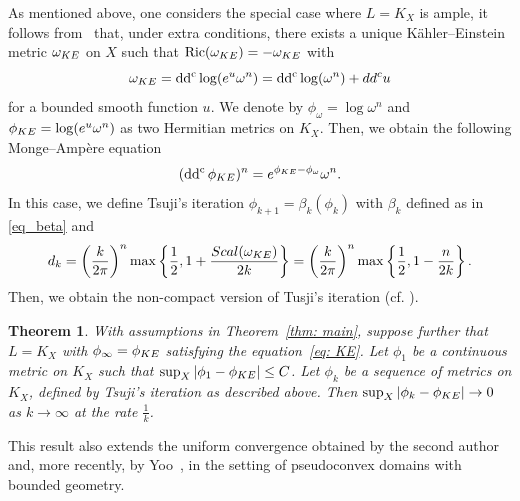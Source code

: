\documentclass[a4paper, 11pt]{amsart}
\theoremstyle{plain}
\newtheorem{theorem}{Theorem}[section]
\numberwithin{equation}{section} %
\numberwithin{figure}{section} %
\theoremstyle{plain}
\theoremstyle{plain}
\theoremstyle{plain}
\theoremstyle{plain}
\theoremstyle{remark}
\theoremstyle{definition}
\theoremstyle{definition}
\DeclareMathOperator \Ric {\textrm{Ric}}
\DeclareMathOperator \ddc{\textrm{dd}^c}
\begin{document}
As mentioned above, one considers the special case where $L=K_X$ is ample, it follows from~\cite{ChengYau80-complete, Wu-Yau20invariant} that, under extra conditions, there exists a unique K\"ahler--Einstein metric $\omega_{\rm KE}$  on $X$   such that  $\Ric (\omega_{\rm KE})=-\omega_{\rm KE}$ with
$$\omega_{\rm KE}= \ddc\log (e^u\omega^n)= \ddc\log (\omega^n) +dd^c u$$ for a bounded smooth function $u$. We denote by $\phi_\omega =\log \omega^n$ and $\phi_{\rm KE}=\log (e^u\omega^n) $ as two Hermitian metrics on $K_X$.  Then, we obtain the following Monge--Amp\`ere equation
\begin{equation}\label{eq: KE}
    (\ddc\phi_{\rm KE})^n=e^{\phi_{\rm KE}-\phi_\omega} \omega^n.
\end{equation}
In this case, we define Tsuji's iteration $ \phi_{k+1}=\beta_k(\phi_k)$ with $\beta_k$ defined as in \eqref{eq_beta} and
\begin{equation}\label{eq:d_k_KE}
    d_k=\left(\frac{k }{2\pi}\right)^n  \max\left\{\frac{1}{2},  1+ \frac{{\rm Scal}(\omega_{\rm KE})}{2k}\right\}=\left(\frac{k  }{2\pi}\right)^n\max\left\{\frac{1}{2},  1- \frac{n}{2k}\right\}.
\end{equation}
Then, we obtain the non-compact version of Tusji's iteration (cf. \cite{Tsuji10-construction-KE,SongWeinkove10-negativecurvature, berndtsson09-remarks-tsuji'}). 
\begin{theorem}   
\label{thm: construction-KE}
With assumptions in Theorem~\ref{thm: main}, suppose further that $L=K_X$ with $\phi_\infty=\phi_{\rm KE}$ satisfying the equation~\eqref{eq: KE}.
 Let  $\phi_1$ be a continuous metric on $K_X$ such that $\sup_X|\phi_1- \phi_{\rm KE}|\leq C$. Let $\phi_k$ be a sequence of metrics on $K_X$, defined by Tsuji's iteration as described above.  Then 
 $\sup_X| \phi_k-\phi_{\rm KE}|\rightarrow 0$
 as $k\rightarrow \infty$ at the rate $\frac{1}{k}$. 
\end{theorem}

This result also extends the uniform convergence obtained by the second author~\cite{To_2022} and, more recently, by Yoo~\cite{Yoo_2024}, in the setting of pseudoconvex domains with bounded geometry. 
\end{document}
